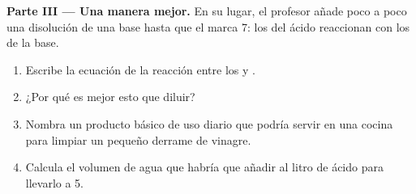 \begin{problem}
\medskip
\noindent\textbf{Parte III --- Una manera mejor.}
En su lugar, el profesor añade poco a poco una disolución de una base
hasta que el  marca 7: los   del ácido
reaccionan con los   de la base.
\begin{enumerate}[resume]
  \item Escribe la ecuación de la reacción entre los   y
        .
  \item ¿Por qué es mejor esto que diluir?
  \item Nombra un producto básico de uso diario que podría servir en una
        cocina para limpiar un pequeño derrame de vinagre.
  \item Calcula el volumen de agua que habría que añadir al litro de
        ácido para llevarlo a  5.
\end{enumerate}
\end{problem}
